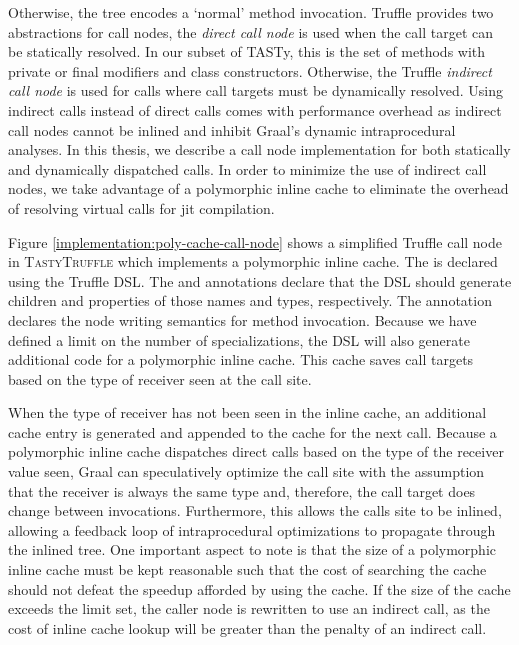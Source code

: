 Otherwise, the  tree encodes a `normal' method invocation.
Truffle provides two abstractions for call nodes, the \textit{direct call node} is used when the call target can be statically resolved. 
In our subset of TASTy, this is the set of methods with private or final modifiers\cite{java:lang-spec} and class constructors. 
Otherwise, the Truffle \textit{indirect call node} is used for calls where call targets must be dynamically resolved. 
Using indirect calls instead of direct calls comes with performance overhead as indirect call nodes cannot be inlined and inhibit Graal's dynamic intraprocedural analyses.
In this thesis, we describe a call node implementation for both statically and dynamically dispatched calls. 
In order to minimize the use of indirect call nodes, we take advantage of a polymorphic inline cache\cite{self:polymorphic-inline-caches} to eliminate the overhead of resolving virtual calls for \acrshort{jit} compilation. 

Figure \ref{implementation:poly-cache-call-node} shows a simplified Truffle call node in \textsc{TastyTruffle} which implements a polymorphic inline cache.
The  is declared using the Truffle DSL.
The  and  annotations declare that the DSL should generate children and properties of those names and types, respectively. 
The  annotation declares the node writing semantics for method invocation.
Because we have defined a limit on the number of specializations, the DSL will also generate additional code for a polymorphic inline cache.
This cache saves call targets based on the type of receiver seen at the call site. 

When the type of receiver has not been seen in the inline cache, an additional cache entry is generated and appended to the cache for the next call.
Because a polymorphic inline cache dispatches direct calls based on the type of the receiver value seen, Graal can speculatively optimize the call site with the assumption that the receiver is always the same type and, therefore, the call target does change between invocations.
Furthermore, this allows the calls site to be inlined, allowing a feedback loop of intraprocedural optimizations\cite{conditional-constant-prop,variable-congruence} to propagate through the inlined tree.
One important aspect to note is that the size of a polymorphic inline cache must be kept reasonable such that the cost of searching the cache should not defeat the speedup afforded by using the cache.
If the size of the cache exceeds the limit set, the caller node is rewritten to use an indirect call, as the cost of inline cache lookup will be greater than the penalty of an indirect call. 

